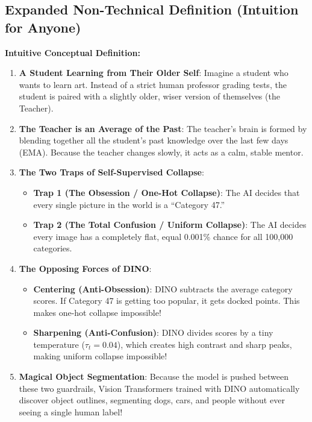 \documentclass[11pt,a4paper]{article}
\theoremstyle{definition}
\begin{document}
\subsection{Expanded Non-Technical Definition (Intuition for Anyone)}
\textbf{Intuitive Conceptual Definition:}
\begin{enumerate}
    \item \textbf{A Student Learning from Their Older Self}: Imagine a student who wants to learn art. Instead of a strict human professor grading tests, the student is paired with a slightly older, wiser version of themselves (the Teacher).
    \item \textbf{The Teacher is an Average of the Past}: The teacher's brain is formed by blending together all the student's past knowledge over the last few days (EMA). Because the teacher changes slowly, it acts as a calm, stable mentor.
    \item \textbf{The Two Traps of Self-Supervised Collapse}:
    \begin{itemize}
        \item \textbf{Trap 1 (The Obsession / One-Hot Collapse)}: The AI decides that every single picture in the world is a ``Category 47.''
        \item \textbf{Trap 2 (The Total Confusion / Uniform Collapse)}: The AI decides every image has a completely flat, equal 0.001\% chance for all 100,000 categories.
    \end{itemize}
    \item \textbf{The Opposing Forces of DINO}:
    \begin{itemize}
        \item \textbf{Centering (Anti-Obsession)}: DINO subtracts the average category scores. If Category 47 is getting too popular, it gets docked points. This makes one-hot collapse impossible!
        \item \textbf{Sharpening (Anti-Confusion)}: DINO divides scores by a tiny temperature ($\tau_t = 0.04$), which creates high contrast and sharp peaks, making uniform collapse impossible!
    \end{itemize}
    \item \textbf{Magical Object Segmentation}: Because the model is pushed between these two guardrails, Vision Transformers trained with DINO automatically discover object outlines, segmenting dogs, cars, and people without ever seeing a single human label!
\end{enumerate}
\end{document}
